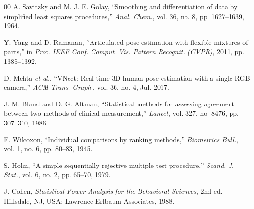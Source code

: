 \documentclass[conference]{IEEEtran}
\begin{document}
\begin{thebibliography}{00}
A. Savitzky and M. J. E. Golay, ``Smoothing and differentiation of data
by simplified least squares procedures,'' \textit{Anal. Chem.}, vol. 36,
no. 8, pp. 1627--1639, 1964.

Y. Yang and D. Ramanan, ``Articulated pose estimation with flexible
mixtures-of-parts,'' in \textit{Proc. IEEE Conf. Comput. Vis. Pattern
Recognit. (CVPR)}, 2011, pp. 1385--1392.

D. Mehta \textit{et al.}, ``VNect: Real-time 3D human pose estimation
with a single RGB camera,'' \textit{ACM Trans. Graph.}, vol. 36, no. 4,
Jul. 2017.

J. M. Bland and D. G. Altman, ``Statistical methods for assessing
agreement between two methods of clinical measurement,'' \textit{Lancet},
vol. 327, no. 8476, pp. 307--310, 1986.

F. Wilcoxon, ``Individual comparisons by ranking methods,''
\textit{Biometrics Bull.}, vol. 1, no. 6, pp. 80--83, 1945.

S. Holm, ``A simple sequentially rejective multiple test procedure,''
\textit{Scand. J. Stat.}, vol. 6, no. 2, pp. 65--70, 1979.

J. Cohen, \textit{Statistical Power Analysis for the Behavioral
Sciences}, 2nd ed. Hillsdale, NJ, USA: Lawrence Erlbaum Associates, 1988.

\end{thebibliography}
\end{document}
